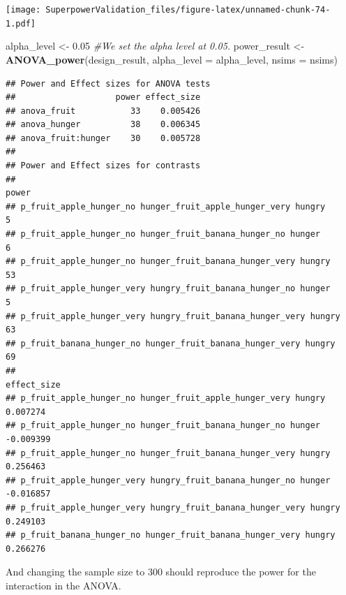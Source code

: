 \documentclass[]{book}
\newenvironment{Shaded}{\begin{snugshade}}{\end{snugshade}}
\newcommand{\CommentTok}[1]{\textcolor[rgb]{0.56,0.35,0.01}{\textit{#1}}}
\newcommand{\DataTypeTok}[1]{\textcolor[rgb]{0.13,0.29,0.53}{#1}}
\newcommand{\FloatTok}[1]{\textcolor[rgb]{0.00,0.00,0.81}{#1}}
\newcommand{\KeywordTok}[1]{\textcolor[rgb]{0.13,0.29,0.53}{\textbf{#1}}}
\newcommand{\NormalTok}[1]{#1}
\newcommand{\StringTok}[1]{\textcolor[rgb]{0.31,0.60,0.02}{#1}}
\begin{document}
\texttt{[image: SuperpowerValidation\_files/figure-latex/unnamed-chunk-74-1.pdf]}

\begin{Shaded}
\begin{Highlighting}[]
\NormalTok{alpha_level <-}\StringTok{ }\FloatTok{0.05} \CommentTok{#We set the alpha level at 0.05. }
\NormalTok{power_result <-}\StringTok{ }\KeywordTok{ANOVA_power}\NormalTok{(design_result, }\DataTypeTok{alpha_level =}\NormalTok{ alpha_level, }\DataTypeTok{nsims =}\NormalTok{ nsims)}
\end{Highlighting}
\end{Shaded}

\begin{verbatim}
## Power and Effect sizes for ANOVA tests
##                    power effect_size
## anova_fruit           33    0.005426
## anova_hunger          38    0.006345
## anova_fruit:hunger    30    0.005728
## 
## Power and Effect sizes for contrasts
##                                                                  power
## p_fruit_apple_hunger_no hunger_fruit_apple_hunger_very hungry        5
## p_fruit_apple_hunger_no hunger_fruit_banana_hunger_no hunger         6
## p_fruit_apple_hunger_no hunger_fruit_banana_hunger_very hungry      53
## p_fruit_apple_hunger_very hungry_fruit_banana_hunger_no hunger       5
## p_fruit_apple_hunger_very hungry_fruit_banana_hunger_very hungry    63
## p_fruit_banana_hunger_no hunger_fruit_banana_hunger_very hungry     69
##                                                                  effect_size
## p_fruit_apple_hunger_no hunger_fruit_apple_hunger_very hungry       0.007274
## p_fruit_apple_hunger_no hunger_fruit_banana_hunger_no hunger       -0.009399
## p_fruit_apple_hunger_no hunger_fruit_banana_hunger_very hungry      0.256463
## p_fruit_apple_hunger_very hungry_fruit_banana_hunger_no hunger     -0.016857
## p_fruit_apple_hunger_very hungry_fruit_banana_hunger_very hungry    0.249103
## p_fruit_banana_hunger_no hunger_fruit_banana_hunger_very hungry     0.266276
\end{verbatim}

And changing the sample size to 300 should reproduce the power for the interaction in the ANOVA.
\end{document}
